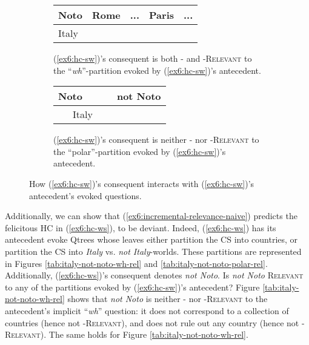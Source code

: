 \begin{figure}[H]
	\centering
	\begin{subfigure}[t]{.47\linewidth}
		\centering
		\begin{tabular}{|lll|ll}
			\hline
			\multicolumn{1}{|l|}{Noto} & \multicolumn{1}{l|}{Rome} & ... & \multicolumn{1}{l|}{Paris} & \multicolumn{1}{l|}{...} \\ \hline
			\multicolumn{3}{|l|}{\cellcolor{blue!20!white}Italy}                             & \multicolumn{2}{l}{}                                  \\ \cline{1-3}
		\end{tabular}
		\caption[]{(\ref{ex6:hc-sw})'s consequent is both \textsc{\citeauthor*{Lewis1988}-} and \textsc{\citeauthor{Roberts2012}-Relevant} to the ``\textit{wh}''-partition evoked by (\ref{ex6:hc-sw})'s antecedent.}\label{tab:not-noto-italy-wh-rel}
	\end{subfigure}
	\hfill
	\begin{subfigure}[t]{.47\linewidth}
		\centering
		\begin{tabular}{|lllll}
			\hline
			\multicolumn{1}{|l|}{Noto} & \multicolumn{4}{l|}{not Noto} \\ \hline
			\multicolumn{3}{|l|}{\cellcolor{blue!20!white}~~~Italy~~~}                &       &       \\ \cline{1-3}
		\end{tabular}
		\caption[]{(\ref{ex6:hc-sw})'s consequent is neither \textsc{\citeauthor*{Lewis1988}-} nor \textsc{\citeauthor{Roberts2012}-Relevant} to the ``polar''-partition evoked by (\ref{ex6:hc-sw})'s antecedent.}\label{tab:not-noto-italy-polar-rel}
	\end{subfigure}
	\caption[]{How (\ref{ex6:hc-sw})'s consequent interacts with (\ref{ex6:hc-sw})'s antecedent's evoked questions.}
\end{figure}

Additionally, we can show that (\ref{ex6:incremental-relevance-naive}) predicts the felicitous HC in (\ref{ex6:hc-ws}), to be deviant.  Indeed, (\ref{ex6:hc-ws}) has its antecedent evoke Qtrees whose leaves either partition the CS into countries, or partition the CS into \textit{Italy} vs. \textit{not Italy}-worlds. These partitions are represented in Figures \ref{tab:italy-not-noto-wh-rel} and \ref{tab:italy-not-noto-polar-rel}. Additionally, (\ref{ex6:hc-ws})'s consequent denotes \textit{not Noto}. Is \textit{not Noto} \textsc{Relevant} to any of the partitions evoked by (\ref{ex6:hc-sw})'s antecedent? Figure \ref{tab:italy-not-noto-wh-rel} shows that \textit{not Noto} is neither \textsc{\citeauthor*{Lewis1988}-} nor \textsc{\citeauthor{Roberts2012}-Relevant} to the antecedent's implicit ``\textit{wh}'' question: it does not correspond to a collection of countries (hence not \textsc{\citeauthor*{Lewis1988}-Relevant}), and does not rule out any country (hence not \textsc{\citeauthor{Roberts2012}-Relevant}). The same holds for Figure \ref{tab:italy-not-noto-wh-rel}.

